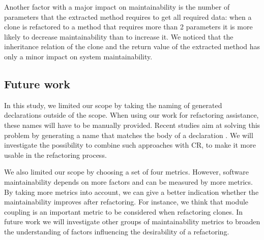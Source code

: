 \documentclass[sigconf,review,anonymous]{acmart}
\begin{document}
Another factor with a major impact on maintainability is the number of parameters that the extracted method requires to get all required data: when a clone is refactored to a method that requires more than 2 parameters it is more likely to decrease maintainability than to increase it. We noticed that the inheritance relation of the clone and the return value of the extracted method has only a minor impact on system maintainability.

\subsection{Future work}
In this study, we limited our scope by taking the naming of generated declarations outside of the scope. When using our work for refactoring assistance, these names will have to be manually provided. Recent studies aim at solving this problem by generating a name that matches the body of a declaration \cite{allamanis2015suggesting, alon2018code2seq}. We will investigate the possibility to combine such approaches with CR, to make it more usable in the refactoring process.

We also limited our scope by choosing a set of four metrics. However, software maintainability depends on more factors and can be measured by more metrics. By taking more metrics into account, we can give a better indication whether the maintainability improves after refactoring. For instance, we think that module coupling \cite{briand1999unified,heitlager2007practical} is an important metric to be considered when refactoring clones. In future work we will investigate other groups of maintainability metrics to broaden the understanding of factors influencing the desirability of a refactoring.



\end{document}
